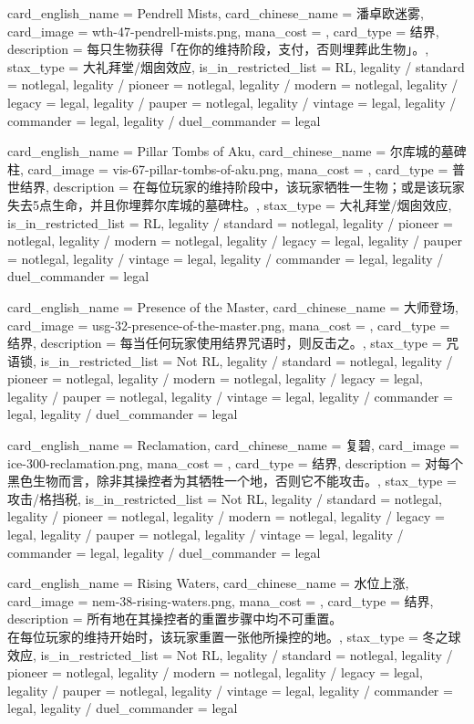 \documentclass[lang = cn, color = black, 10pt]{AllThatStax}
\begin{document}
\card
{
	card_english_name = {Pendrell Mists},
	card_chinese_name = {潘卓欧迷雾},
	card_image = wth-47-pendrell-mists.png,
	mana_cost = ,
	card_type = 结界,
	description = {每只生物获得「在你的维持阶段，支付，否则埋葬此生物」。},
	stax_type = 大礼拜堂/烟囱效应,
	is_in_restricted_list = RL,
	legality / standard = notlegal,
	legality / pioneer = notlegal,
	legality / modern = notlegal,
	legality / legacy = legal,
	legality / pauper = notlegal,
	legality / vintage = legal,
	legality / commander = legal,
	legality / duel_commander = legal
}

\card
{
	card_english_name = {Pillar Tombs of Aku},
	card_chinese_name = {尔库城的墓碑柱},
	card_image = vis-67-pillar-tombs-of-aku.png,
	mana_cost = ,
	card_type = 普世结界,
	description = {在每位玩家的维持阶段中，该玩家牺牲一生物；或是该玩家失去5点生命，并且你埋葬尔库城的墓碑柱。},
	stax_type = 大礼拜堂/烟囱效应,
	is_in_restricted_list = RL,
	legality / standard = notlegal,
	legality / pioneer = notlegal,
	legality / modern = notlegal,
	legality / legacy = legal,
	legality / pauper = notlegal,
	legality / vintage = legal,
	legality / commander = legal,
	legality / duel_commander = legal
}

\card
{
	card_english_name = {Presence of the Master},
	card_chinese_name = {大师登场},
	card_image = usg-32-presence-of-the-master.png,
	mana_cost = ,
	card_type = 结界,
	description = {每当任何玩家使用结界咒语时，则反击之。},
	stax_type = 咒语锁,
	is_in_restricted_list = Not RL,
	legality / standard = notlegal,
	legality / pioneer = notlegal,
	legality / modern = notlegal,
	legality / legacy = legal,
	legality / pauper = notlegal,
	legality / vintage = legal,
	legality / commander = legal,
	legality / duel_commander = legal
}

\card
{
	card_english_name = {Reclamation},
	card_chinese_name = {复碧},
	card_image = ice-300-reclamation.png,
	mana_cost = ,
	card_type = 结界,
	description = {对每个黑色生物而言，除非其操控者为其牺牲一个地，否则它不能攻击。},
	stax_type = 攻击/格挡税,
	is_in_restricted_list = Not RL,
	legality / standard = notlegal,
	legality / pioneer = notlegal,
	legality / modern = notlegal,
	legality / legacy = legal,
	legality / pauper = notlegal,
	legality / vintage = legal,
	legality / commander = legal,
	legality / duel_commander = legal
}

\card
{
	card_english_name = {Rising Waters},
	card_chinese_name = {水位上涨},
	card_image = nem-38-rising-waters.png,
	mana_cost = ,
	card_type = 结界,
	description = {所有地在其操控者的重置步骤中均不可重置。\\
在每位玩家的维持开始时，该玩家重置一张他所操控的地。},
	stax_type = 冬之球效应,
	is_in_restricted_list = Not RL,
	legality / standard = notlegal,
	legality / pioneer = notlegal,
	legality / modern = notlegal,
	legality / legacy = legal,
	legality / pauper = notlegal,
	legality / vintage = legal,
	legality / commander = legal,
	legality / duel_commander = legal
}
\end{document}
